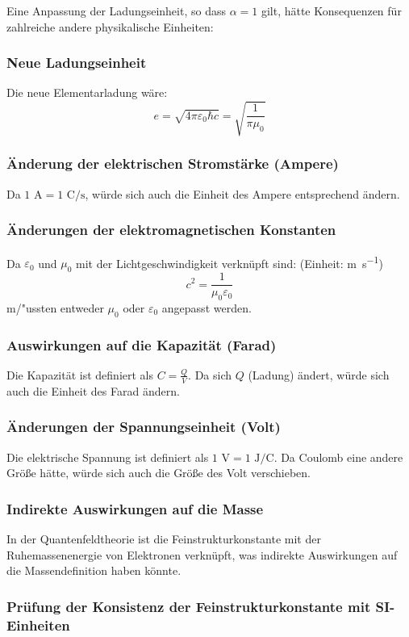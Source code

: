 \documentclass{article}
\begin{document}
	Eine Anpassung der Ladungseinheit, so dass $\alpha = 1$ gilt, hätte Konsequenzen für zahlreiche andere physikalische Einheiten:
	
	\subsubsection{Neue Ladungseinheit}
	Die neue Elementarladung wäre:
	$$e = \sqrt{4\pi\varepsilon_0\hbar c} = \sqrt{\frac{1}{\pi \mu_0}}$$
	
	\subsubsection{Änderung der elektrischen Stromstärke (Ampere)}
	Da $1 \text{ A} = 1 \text{ C}/\text{s}$, würde sich auch die Einheit des Ampere entsprechend ändern.
	
	\subsubsection{Änderungen der elektromagnetischen Konstanten}
	Da $\varepsilon_0$ und $\mu_0$ mit der Lichtgeschwindigkeit verknüpft sind:
	(Einheit: \si{\meter\per\second})	$$c^2 = \frac{1}{\mu_0\varepsilon_0}$$
	m/"ussten entweder $\mu_0$ oder $\varepsilon_0$ angepasst werden.
	
	\subsubsection{Auswirkungen auf die Kapazität (Farad)}
	Die Kapazität ist definiert als $C = \frac{Q}{V}$. Da sich $Q$ (Ladung) ändert, würde sich auch die Einheit des Farad ändern.
	
	\subsubsection{Änderungen der Spannungseinheit (Volt)}
	Die elektrische Spannung ist definiert als $1 \text{ V} = 1 \text{ J}/\text{C}$. Da Coulomb eine andere Größe hätte, würde sich auch die Größe des Volt verschieben.
	
	\subsubsection{Indirekte Auswirkungen auf die Masse}
	In der Quantenfeldtheorie ist die Feinstrukturkonstante mit der Ruhemassenenergie von Elektronen verknüpft, was indirekte Auswirkungen auf die Massendefinition haben könnte.
	\subsubsection{Prüfung der Konsistenz der Feinstrukturkonstante mit SI-Einheiten}
	
\end{document}
